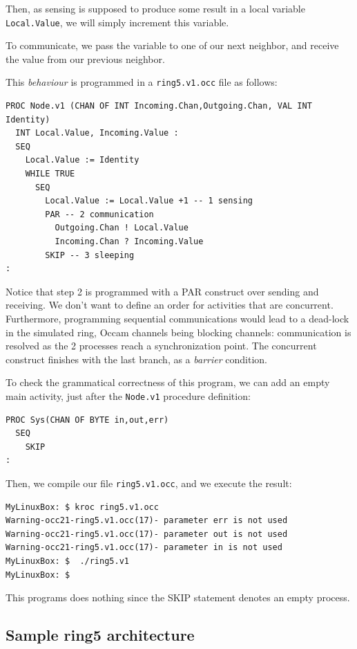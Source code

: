 \documentclass[times,a4paper]{book}
\begin{document}
Then, as sensing is supposed to produce some result in a local variable {\tt Local.Value},
we will simply increment this variable. 

To communicate, we pass the variable to one of our next neighbor, and receive the value 
from our previous neighbor.

This {\sl behaviour} is programmed in a {\tt ring5.v1.occ} file as follows:


\begin{lstlisting}  
PROC Node.v1 (CHAN OF INT Incoming.Chan,Outgoing.Chan, VAL INT Identity)  
  INT Local.Value, Incoming.Value :
  SEQ
    Local.Value := Identity
    WHILE TRUE
      SEQ
        Local.Value := Local.Value +1 -- 1 sensing
        PAR -- 2 communication
          Outgoing.Chan ! Local.Value
          Incoming.Chan ? Incoming.Value
        SKIP -- 3 sleeping
:
\end{lstlisting} 

Notice that step 2 is programmed with a PAR construct over sending and receiving.
We don't want to define an order for activities that are concurrent. Furthermore,
programming sequential communications would lead to a dead-lock in the
simulated ring, Occam channels being blocking channels: communication is resolved
as the 2 processes reach a synchronization point.
The concurrent construct finishes with the last branch, as a {\sl barrier} condition.

To check the grammatical correctness of this program, we can add an empty 
main activity, just after the {\tt Node.v1} procedure definition:

\begin{lstlisting}  
PROC Sys(CHAN OF BYTE in,out,err)
  SEQ
    SKIP
:
\end{lstlisting}  

Then, we compile our file {\tt ring5.v1.occ}, and we execute the result:

\begin{lstlisting}  
MyLinuxBox: $ kroc ring5.v1.occ
Warning-occ21-ring5.v1.occ(17)- parameter err is not used
Warning-occ21-ring5.v1.occ(17)- parameter out is not used
Warning-occ21-ring5.v1.occ(17)- parameter in is not used 
MyLinuxBox: $  ./ring5.v1
MyLinuxBox: $ 
\end{lstlisting} 

This programs does nothing since the SKIP statement denotes an empty process.

\subsection {Sample ring5 architecture}
\label{sec:simpleRigV2}
\end{document}
